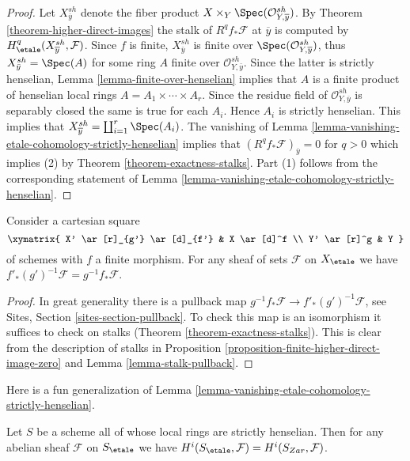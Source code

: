 \begin{proof}
Let $X_{\overline{y}}^{sh}$ denote the fiber product
$X \times_Y \Spec(\mathcal{O}_{Y, \overline{y}}^{sh})$.
By Theorem \ref{theorem-higher-direct-images}
the stalk of $R^qf_*\mathcal{F}$ at $\overline{y}$ is computed by
$H_\etale^q(X_{\overline{y}}^{sh}, \mathcal{F})$.
Since $f$ is finite, $X_{\bar y}^{sh}$ is finite over
$\Spec(\mathcal{O}_{Y, \overline{y}}^{sh})$, thus
$X_{\bar y}^{sh} = \Spec(A)$ for some ring $A$
finite over $\mathcal{O}_{Y, \bar y}^{sh}$.
Since the latter is strictly henselian,
Lemma \ref{lemma-finite-over-henselian}
implies that $A$ is a finite product of henselian local rings
$A = A_1 \times \cdots \times A_r$. Since the residue field of
$\mathcal{O}_{Y, \overline{y}}^{sh}$ is separably closed the
same is true for each $A_i$. Hence $A_i$ is strictly henselian.
This implies that $X_{\overline{y}}^{sh} = \coprod_{i=1}^r \Spec(A_i)$.
The vanishing of
Lemma \ref{lemma-vanishing-etale-cohomology-strictly-henselian}
implies that $(R^qf_*\mathcal{F})_{\overline{y}} = 0$ for $q > 0$
which implies (2) by Theorem \ref{theorem-exactness-stalks}.
Part (1) follows from the corresponding statement of
Lemma \ref{lemma-vanishing-etale-cohomology-strictly-henselian}.
\end{proof}

\begin{lemma}
\label{lemma-finite-pushforward-commutes-with-base-change}
Consider a cartesian square
$$
\xymatrix{
X' \ar[r]_{g'} \ar[d]_{f'} & X \ar[d]^f \\
Y' \ar[r]^g & Y
}
$$
of schemes with $f$ a finite morphism. For any sheaf of sets
$\mathcal{F}$ on $X_\etale$ we have
$f'_*(g')^{-1}\mathcal{F} = g^{-1}f_*\mathcal{F}$.
\end{lemma}

\begin{proof}
In great generality there is a pullback map
$g^{-1}f_*\mathcal{F} \to f'_*(g')^{-1}\mathcal{F}$, see
Sites, Section \ref{sites-section-pullback}.
To check this map is an isomorphism it suffices to check
on stalks (Theorem \ref{theorem-exactness-stalks}).
This is clear from the description of stalks
in Proposition \ref{proposition-finite-higher-direct-image-zero} and
Lemma \ref{lemma-stalk-pullback}.
\end{proof}

\noindent
Here is a fun generalization of
Lemma \ref{lemma-vanishing-etale-cohomology-strictly-henselian}.

\begin{lemma}
\label{lemma-quasi-compact-closed-points-henselian}
Let $S$ be a scheme all of whose local rings are strictly henselian.
Then for any abelian sheaf $\mathcal{F}$ on $S_\etale$ we have
$H^i(S_\etale, \mathcal{F}) = H^i(S_{Zar}, \mathcal{F})$.
\end{lemma}

